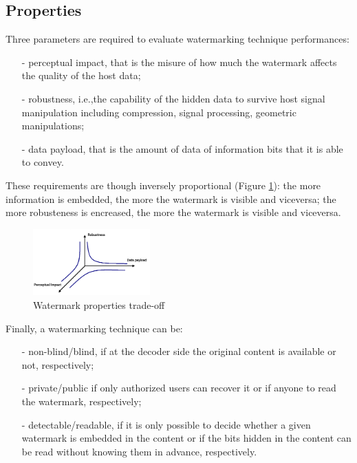 \subsection{Properties}
Three parameters are required to evaluate watermarking technique performances:
\begin{itemize}
\item[-] perceptual impact, that is the misure of how much the watermark affects the quality of the host data;
\item[-] robustness, i.e.,the capability of the hidden data to survive host signal manipulation including compression, signal processing, geometric manipulations;
\item[-] data payload, that is the amount of data of information bits that it is able to convey.
\end{itemize}
These requirements are though inversely proportional (Figure \ref{fig:properties}): the more information is embedded, the more the watermark is visible and viceversa; the more robusteness is encreased, the more the watermark is visible and viceversa.\\
\begin{figure}[h!]
\centering
\includegraphics[width=0.4\textwidth]{./img/properties.png}
\caption{\small{Watermark properties trade-off}}
\label{fig:properties}
\end{figure}
Finally, a watermarking technique can be:
\begin{itemize}
\item[-] non-blind/blind, if at the decoder side the original content is available or not, respectively;
\item[-] private/public if only authorized users
can recover it or if anyone to read the watermark, respectively;
\item[-] detectable/readable, if it is only possible to decide whether a given watermark is embedded in the content or if the bits hidden in the content can be read without knowing them in advance, respectively.
\end{itemize}




